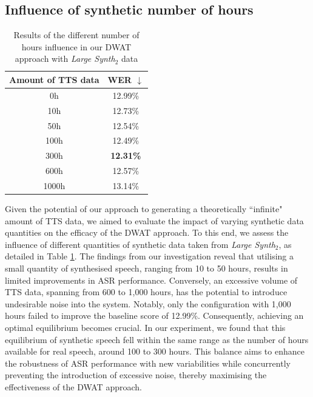 \subsection{Influence of synthetic number of hours}
\begin{table}[t]
\centering
\begin{tabular}{cc}
\hline
 Amount of TTS data & WER $\downarrow$   \\ \hline
\multicolumn{1}{c}{0h} & 12.99\% \\ \hline
\multicolumn{1}{c}{10h}  &   12.73\%   \\ 
\multicolumn{1}{c}{50h}    & 12.54\%   \\ 
\multicolumn{1}{c}{100h} & 12.49\%  \\ 
\multicolumn{1}{c}{300h} & \textbf{12.31\%}  \\ 
\multicolumn{1}{c}{600h} & 12.57\%  \\ 
\multicolumn{1}{c}{1000h} & 13.14\%  \\ \hline

\end{tabular}

\caption{Results of the different number of hours influence in our DWAT approach with \textit{Large Synth$_2$} data}
\label{tab:hours}
\end{table}

Given the potential of our approach to generating a theoretically ``infinite" amount of \ac{TTS} data, we aimed to evaluate the impact of varying synthetic data quantities on the efficacy of the \ac{DWAT} approach. To this end, we assess the influence of different quantities of synthetic data taken from \textit{Large Synth$_2$}, as detailed in Table \ref{tab:hours}.
The findings from our investigation reveal that utilising a small quantity of synthesised speech, ranging from 10 to 50 hours, results in limited improvements in \ac{ASR} performance. Conversely, an excessive volume of \ac{TTS} data, spanning from 600 to 1,000 hours, has the potential to introduce undesirable noise into the system. Notably, only the configuration with 1,000 hours failed to improve the baseline score of 12.99\%. Consequently, achieving an optimal equilibrium becomes crucial. In our experiment, we found that this equilibrium of synthetic speech fell within the same range as the number of hours available for real speech, around 100 to 300 hours. This balance aims to enhance the robustness of \ac{ASR} performance with new variabilities while concurrently preventing the introduction of excessive noise, thereby maximising the effectiveness of the \ac{DWAT} approach.

